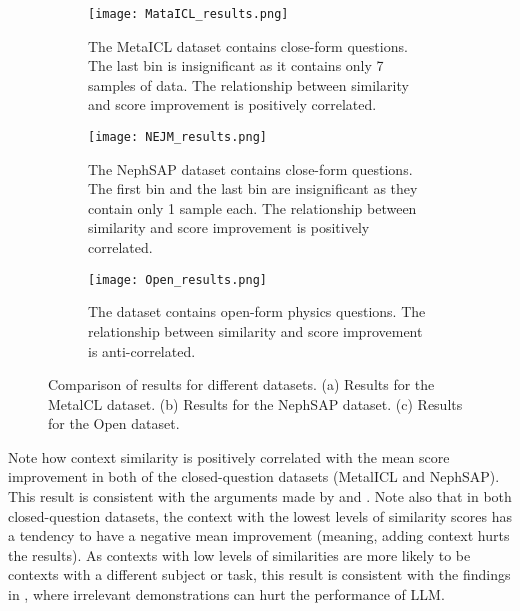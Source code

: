 \documentclass{article}
\begin{document}
    \begin{figure}
        \centering
        
        \begin{subfigure}[b]{0.48\textwidth}  %
            \centering
            \texttt{[image: MataICL\_results.png]}
            \caption{The MetaICL dataset contains close-form questions. The last bin is insignificant as it contains only 7 samples of data. The relationship between similarity and score improvement is positively correlated.}
            \label{fig:figure2}
        \end{subfigure}
        \hfill  %
        \begin{subfigure}[b]{0.48\textwidth}  %
            \centering
            \texttt{[image: NEJM\_results.png]}
            \caption{The NephSAP dataset contains close-form questions. The first bin and the last bin are insignificant as they contain only 1 sample each. The relationship between similarity and score improvement is positively correlated.}
            \label{fig:figure3}
        \end{subfigure}
        
        \vspace{0.5cm}  %
        \begin{subfigure}[b]{0.48\textwidth}  %
            \centering
            \texttt{[image: Open\_results.png]}
            \caption{The dataset contains open-form physics questions. The relationship between similarity and score improvement is anti-correlated.}
            \label{fig:figure1}
        \end{subfigure}
        
        \caption{Comparison of results for different datasets. (a) Results for the MetalCL dataset. (b) Results for the NephSAP dataset. (c) Results for the Open dataset.}
        \label{fig:mergedfigures}
    \end{figure}

    Note how context similarity is positively correlated with the mean score improvement in both of the closed-question datasets (MetalICL and NephSAP). This result is consistent with the arguments made by \citet{DBLP:journals/corr/abs-2101-06804} and \citet{rubin-etal-2022-learning}. Note also that in both closed-question datasets, the context with the lowest levels of similarity scores has a tendency to have a negative mean improvement (meaning, adding context hurts the results). As contexts with low levels of similarities are more likely to be contexts with a different subject or task, this result is consistent with the findings in \citep{DBLP:journals/corr/abs-2101-06804}, where irrelevant demonstrations can hurt the performance of LLM.
\end{document}

